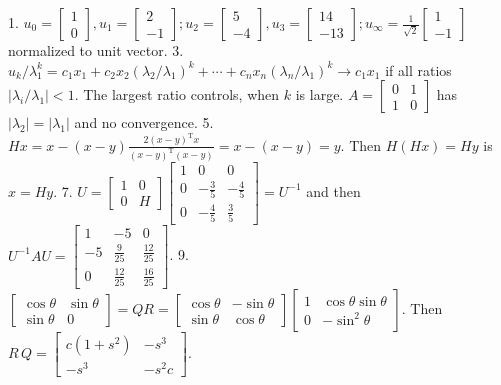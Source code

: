 1. \(u_{0}=\begin{bmatrix}1\\ 0\end{bmatrix},u_{1}=\begin{bmatrix}2\\ -1\end{bmatrix};u_{2}=\begin{bmatrix}5\\ -4\end{bmatrix},u_{3}=\begin{bmatrix}14\\ -13\end{bmatrix};u_{\infty}=\frac{1}{\sqrt{2}}\begin{bmatrix}1\\ -1\end{bmatrix}\) normalized to unit vector.
3. \(u_{k}/\lambda_{1}^{k}=c_{1}x_{1}+c_{2}x_{2}(\lambda_{2}/\lambda_{1})^{k}+ \cdots+c_{n}x_{n}(\lambda_{n}/\lambda_{1})^{k}\to c_{1}x_{1}\) if all ratios \(|\lambda_{i}/\lambda_{1}|<1\). The largest ratio controls, when \(k\) is large. \(A=\begin{bmatrix}0&1\\ 1&0\end{bmatrix}\) has \(|\lambda_{2}|=|\lambda_{1}|\) and no convergence.
5. \(Hx=x-(x-y)\frac{2(x-y)^{\mathrm{T}}x}{(x-y)^{\mathrm{T}}(x-y)}=x-(x-y)=y\). Then \(H(Hx)=Hy\) is \(x=Hy\).
7. \(U=\begin{bmatrix}1&0\\ 0&H\end{bmatrix}\begin{bmatrix}1&0&0\\ 0&-\frac{3}{5}&-\frac{4}{5}\\ 0&-\frac{4}{5}&\frac{3}{5}\end{bmatrix}=U^{-1}\) and then \(U^{-1}AU=\begin{bmatrix}1&-5&0\\ -5&\frac{9}{25}&\frac{12}{25}\\ 0&\frac{12}{25}&\frac{16}{25}\end{bmatrix}\).
9. \(\begin{bmatrix}\cos\theta&\sin\theta\\ \sin\theta&0\end{bmatrix}=QR=\begin{bmatrix}\cos\theta&-\sin\theta\\ \sin\theta&\cos\theta\end{bmatrix}\begin{bmatrix}1&\cos\theta\sin\theta\\ 0&-\sin^{2}\theta\end{bmatrix}\). Then \(R\,Q=\begin{bmatrix}c(1+s^{2})&-s^{3}\\ -s^{3}&-s^{2}c\end{bmatrix}\).
